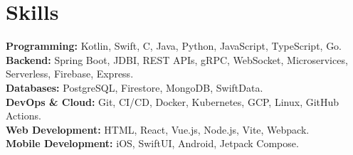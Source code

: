 \documentclass[11pt,a4paper]{moderncv}
\begin{document}
\newpage

\section{Skills}
\textbf{Programming:} Kotlin, Swift, C, Java, Python, JavaScript, TypeScript, Go. \\[6pt]
\textbf{Backend:} Spring Boot, JDBI, REST APIs, gRPC, WebSocket, Microservices, Serverless, Firebase, Express. \\[6pt]
\textbf{Databases:} PostgreSQL, Firestore, MongoDB, SwiftData. \\[6pt]
\textbf{DevOps \& Cloud:} Git, CI/CD, Docker, Kubernetes, GCP, Linux, GitHub Actions. \\[6pt]
\textbf{Web Development:} HTML, React, Vue.js, Node.js, Vite, Webpack. \\[6pt]
\textbf{Mobile Development:} iOS, SwiftUI, Android, Jetpack Compose.


\end{document}
